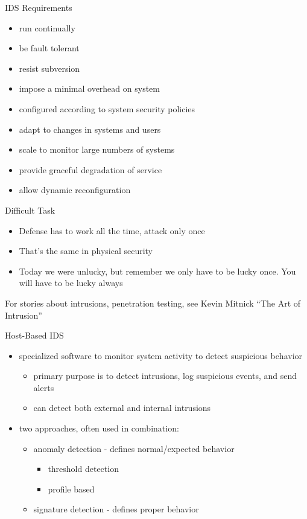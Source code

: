 \documentclass{beamer}
\begin{document}
\begin{frame}{IDS Requirements}
  \begin{itemize}
  \item run continually 
  \item be fault tolerant 
  \item resist subversion 
  \item impose a minimal overhead on system 
  \item configured according to system security policies 
  \item adapt to changes in systems and users 
  \item scale to monitor large numbers of systems 
  \item provide graceful degradation of service 
  \item allow dynamic reconfiguration 
  \end{itemize}
\end{frame}

\begin{frame}{Difficult Task}
  \begin{itemize}
  \item Defense has to work all the time, attack only 
    once
  \item That's the same in physical security
  \item Today we were unlucky,
    but remember we only have to be lucky once.
    You will have to be lucky always
  \end{itemize}
  For stories about intrusions, penetration testing, 
see Kevin Mitnick ``The Art of Intrusion''
\end{frame}

\begin{frame}{Host-Based IDS}
  \begin{itemize}
  \item specialized software to monitor system activity to 
    detect suspicious behavior 
    \begin{itemize}
    \item primary purpose is to detect intrusions, log suspicious events, 
      and send alerts 
    \item can detect both external and internal intrusions 
    \end{itemize}
  \item two approaches, often used in combination: 
    \begin{itemize}
    \item anomaly detection - defines normal/expected behavior 
      \begin{itemize}
      \item threshold detection 
      \item profile based 
      \end{itemize}
    \item signature detection - defines proper behavior
    \end{itemize}
  \end{itemize}
\end{frame}
\end{document}
